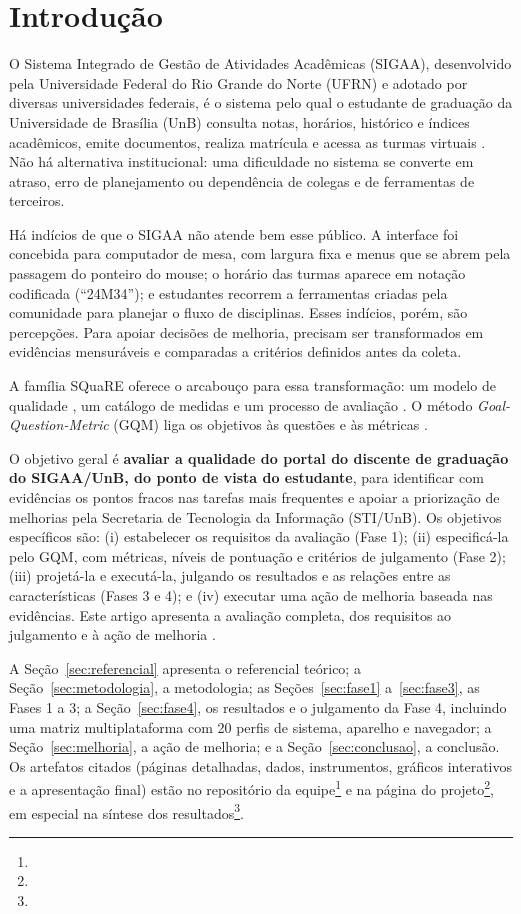 \section{Introdução}
\label{sec:introducao}

O Sistema Integrado de Gestão de Atividades Acadêmicas (SIGAA), desenvolvido pela Universidade Federal do Rio Grande do Norte (UFRN) e adotado por diversas universidades federais, é o sistema pelo qual o estudante de graduação da Universidade de Brasília (UnB) consulta notas, horários, histórico e índices acadêmicos, emite documentos, realiza matrícula e acessa as turmas virtuais \cite{sigaa}. Não há alternativa institucional: uma dificuldade no sistema se converte em atraso, erro de planejamento ou dependência de colegas e de ferramentas de terceiros.

Há indícios de que o SIGAA não atende bem esse público. A interface foi concebida para computador de mesa, com largura fixa e menus que se abrem pela passagem do ponteiro do mouse; o horário das turmas aparece em notação codificada (``24M34''); e estudantes recorrem a ferramentas criadas pela comunidade para planejar o fluxo de disciplinas. Esses indícios, porém, são percepções. Para apoiar decisões de melhoria, precisam ser transformados em evidências mensuráveis e comparadas a critérios definidos antes da coleta.

A família SQuaRE oferece o arcabouço para essa transformação: um modelo de qualidade \cite{iso25010_2023}, um catálogo de medidas \cite{iso25023} e um processo de avaliação \cite{iso25040}. O método \textit{Goal-Question-Metric} (GQM) liga os objetivos às questões e às métricas \cite{basili1994}.

O objetivo geral é \textbf{avaliar a qualidade do portal do discente de graduação do SIGAA/UnB, do ponto de vista do estudante}, para identificar com evidências os pontos fracos nas tarefas mais frequentes e apoiar a priorização de melhorias pela Secretaria de Tecnologia da Informação (STI/UnB). Os objetivos específicos são: (i) estabelecer os requisitos da avaliação (Fase 1); (ii) especificá-la pelo GQM, com métricas, níveis de pontuação e critérios de julgamento (Fase 2); (iii) projetá-la e executá-la, julgando os resultados e as relações entre as características (Fases 3 e 4); e (iv) executar uma ação de melhoria baseada nas evidências. Este artigo apresenta a avaliação completa, dos requisitos ao julgamento e à ação de melhoria \cite{ramos2026roteiro}.

A Seção~\ref{sec:referencial} apresenta o referencial teórico; a Seção~\ref{sec:metodologia}, a metodologia; as Seções~\ref{sec:fase1} a~\ref{sec:fase3}, as Fases 1 a 3; a Seção~\ref{sec:fase4}, os resultados e o julgamento da Fase 4, incluindo uma matriz multiplataforma com 20 perfis de sistema, aparelho e navegador; a Seção~\ref{sec:melhoria}, a ação de melhoria; e a Seção~\ref{sec:conclusao}, a conclusão. Os artefatos citados (páginas detalhadas, dados, instrumentos, gráficos interativos e a apresentação final) estão no repositório da equipe\footnote{\repositorio} e na página do projeto\footnote{\gitpage}, em especial na síntese dos resultados\footnote{\sintese}.
